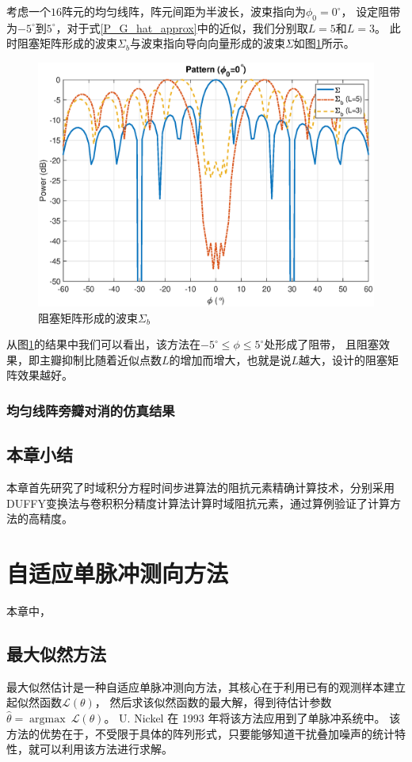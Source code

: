 \documentclass[master]{thesis-uestc}
\begin{document}
考虑一个$16$阵元的均匀线阵，阵元间距为半波长，波束指向为$\phi_0=0^\circ$，
设定阻带为$-5^\circ$到$5^\circ$，对于式\eqref{P_G_hat_approx}中的近似，我们分别取$L=5$和$L=3$。
此时阻塞矩阵形成的波束$\Sigma_b$与波束指向导向向量形成的波束$\Sigma$如图\ref{GSC_Block_dif_L}所示。
\begin{figure}[h]
    \includegraphics[scale=0.4]{pic/GSC_Block.eps}
    \caption{阻塞矩阵形成的波束$\Sigma_b$}
    \label{GSC_Block_dif_L}
\end{figure}

从图\ref{GSC_Block_dif_L}的结果中我们可以看出，该方法在$-5^\circ\le\phi\le5^\circ$处形成了阻带，
且阻塞效果，即主瓣抑制比随着近似点数$L$的增加而增大，也就是说$L$越大，设计的阻塞矩阵效果越好。

\subsection{均匀线阵旁瓣对消的仿真结果}

\section{本章小结}
本章首先研究了时域积分方程时间步进算法的阻抗元素精确计算技术，分别采用DUFFY变换法与卷积积分精度计算法计算时域阻抗元素，通过算例验证了计算方法的高精度。

\chapter{自适应单脉冲测向方法}
本章中，

\section{最大似然方法}
最大似然估计是一种自适应单脉冲测向方法，其核心在于利用已有的观测样本建立起似然函数$\mathcal{L}(\theta)$，
然后求该似然函数的最大解，得到待估计参数$\hat{\theta}=\operatorname{argmax}~\mathcal{L}(\theta)$。
U. Nickel 在 1993 年将该方法应用到了单脉冲系统中\cite{Nickel_93}。
该方法的优势在于，不受限于具体的阵列形式，只要能够知道干扰叠加噪声的统计特性，就可以利用该方法进行求解。
\end{document}
